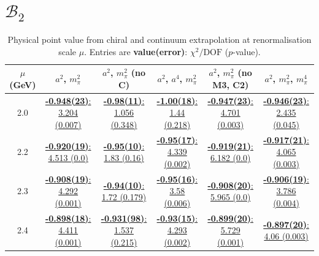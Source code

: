 \documentclass[12pt]{extarticle}
\begin{document}
\section{$\mathcal{B}_2$}
\begin{table}[h!]
\begin{center}
\begin{tabular}{|c|c|c|c|c|c|}
\hline
$\mu$ (GeV) & $a^2$, $m_\pi^2$& $a^2$, $m_\pi^2$ (no C)& $a^2$, $a^4$, $m_\pi^2$& $a^2$, $m_\pi^2$ (no M3, C2)& $a^2$, $m_\pi^2$, $m_\pi^4$\\
\hline
2.0& \hyperlink{VVmAA/SUSY/a2m2_20.pdf.1}{\textbf{-0.948(23)}: 3.204 (0.007)} & \hyperlink{VVmAA/SUSY/a2m2noC_20.pdf.1}{\textbf{-0.98(11)}: 1.056 (0.348)} & \hyperlink{VVmAA/SUSY/a2a4m2_20.pdf.1}{\textbf{-1.00(18)}: 1.44 (0.218)} & \hyperlink{VVmAA/SUSY/a2m2mcut_20.pdf.1}{\textbf{-0.947(23)}: 4.701 (0.003)} & \hyperlink{VVmAA/SUSY/a2m2m4_20.pdf.1}{\textbf{-0.946(23)}: 2.435 (0.045)}\\
2.2& \hyperlink{VVmAA/SUSY/a2m2_22.pdf.1}{\textbf{-0.920(19)}: 4.513 (0.0)} & \hyperlink{VVmAA/SUSY/a2m2noC_22.pdf.1}{\textbf{-0.95(10)}: 1.83 (0.16)} & \hyperlink{VVmAA/SUSY/a2a4m2_22.pdf.1}{\textbf{-0.95(17)}: 4.339 (0.002)} & \hyperlink{VVmAA/SUSY/a2m2mcut_22.pdf.1}{\textbf{-0.919(21)}: 6.182 (0.0)} & \hyperlink{VVmAA/SUSY/a2m2m4_22.pdf.1}{\textbf{-0.917(21)}: 4.065 (0.003)}\\
2.3& \hyperlink{VVmAA/SUSY/a2m2_23.pdf.1}{\textbf{-0.908(19)}: 4.292 (0.001)} & \hyperlink{VVmAA/SUSY/a2m2noC_23.pdf.1}{\textbf{-0.94(10)}: 1.72 (0.179)} & \hyperlink{VVmAA/SUSY/a2a4m2_23.pdf.1}{\textbf{-0.95(16)}: 3.58 (0.006)} & \hyperlink{VVmAA/SUSY/a2m2mcut_23.pdf.1}{\textbf{-0.908(20)}: 5.965 (0.0)} & \hyperlink{VVmAA/SUSY/a2m2m4_23.pdf.1}{\textbf{-0.906(19)}: 3.786 (0.004)}\\
2.4& \hyperlink{VVmAA/SUSY/a2m2_24.pdf.1}{\textbf{-0.898(18)}: 4.411 (0.001)} & \hyperlink{VVmAA/SUSY/a2m2noC_24.pdf.1}{\textbf{-0.931(98)}: 1.537 (0.215)} & \hyperlink{VVmAA/SUSY/a2a4m2_24.pdf.1}{\textbf{-0.93(15)}: 4.293 (0.002)} & \hyperlink{VVmAA/SUSY/a2m2mcut_24.pdf.1}{\textbf{-0.899(20)}: 5.729 (0.001)} & \hyperlink{VVmAA/SUSY/a2m2m4_24.pdf.1}{\textbf{-0.897(20)}: 4.06 (0.003)}\\
\hline
\end{tabular}
\caption{Physical point value from chiral and continuum extrapolation at renormalisation scale $\mu$. Entries are \textbf{value(error)}: $\chi^2/\text{DOF}$ ($p$-value).}
\end{center}
\end{table}
\end{document}

